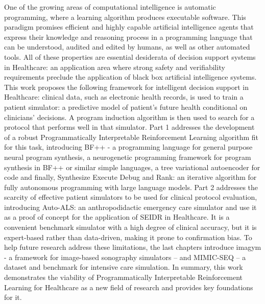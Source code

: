 One of the growing areas of computational intelligence is automatic programming, where a learning algorithm produces executable software. This paradigm promises efficient and highly capable artificial intelligence agents that express their knowledge and reasoning process in a programming language that can be understood, audited and edited by humans, as well as other automated tools. All of these properties are essential desiderata of decision support systems in Healthcare: an application area where strong safety and verifiability requirements preclude the application of black box artificial intelligence systems.
This work proposes the following framework for intelligent decision support in Healthcare: clinical data, such as electronic health records, is used to train a patient simulator: a predictive model of patient’s future health conditional on clinicians’ decisions. A program induction algorithm is then used to search for a protocol that performs well in that simulator.
Part 1 addresses the development of a robust Programmatically Interpretable Reinforcement Learning algorithm fit for this task, introducing BF++ - a programming language for general purpose neural program synthesis, a neurogenetic programming framework for program synthesis in BF++ or similar simple languages, a tree variational autoencoder for code and finally, Synthesize Execute Debug and Rank: an iterative algorithm for fully autonomous programming with large language models.
Part 2 addresses the scarcity of effective patient simulators to be used for clinical protocol evaluation, introducing Auto-ALS: an anthropodidactic emergency care simulator and use it as a proof of concept for the application of SEIDR in Healthcare.
It is a convenient benchmark simulator with a high degree of clinical accuracy, but it is expert-based rather than data-driven, making it prone to confirmation bias. 
To help future research address these limitations, the last chapters introduce imagym - a framework for image-based sonography simulators – and MIMIC-SEQ – a dataset and benchmark for intensive care simulation. 
In summary, this work demonstrates the viability of Programmatically Interpretable Reinforcement Learning for Healthcare as a new field of research and provides key foundations for it.